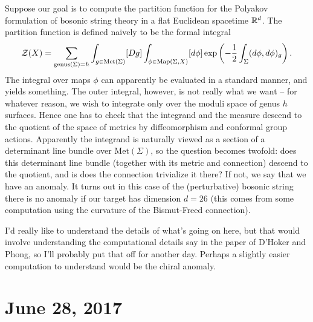 \documentclass{amsart}
\begin{document}
Suppose our goal is to compute the partition function for the Polyakov formulation
of bosonic string theory in a flat Euclidean spacetime $\mathbb{R}^d$.
The partition function is defined naively to be the formal integral
\begin{equation*}
    \mathcal{Z}(X) = \sum_{\text{genus}(\Sigma)=h} \int_{g\in\text{Met}(\Sigma)} [Dg]
        \int_{\phi\in\operatorname*{Map}(\Sigma, X)} [d\phi] \exp\left( -\frac{1}{2}\int_\Sigma (d\phi,d\phi)_g \right).
\end{equation*}
The integral over maps $\phi$ can apparently be evaluated in a standard manner,
and yields something. The outer integral, however, is not really what we want --
for whatever reason, we wish to integrate only over the moduli space of genus $h$
surfaces. Hence one has to check that the integrand and the measure descend to
the quotient of the space of metrics by diffeomorphism and conformal group actions.
Apparently the integrand is naturally viewed as a section of a determinant line
bundle over $\text{Met}(\Sigma)$, so the question becomes twofold: does this 
determinant line bundle (together with its metric and connection) descend to the quotient,
and is does the connection trivialize it there? If not, we say that we have an anomaly.
It turns out in this case of the (perturbative) bosonic string there is no anomaly
if our target has dimension $d=26$ (this comes from some computation using the
curvature of the Bismut-Freed connection).

I'd really like to understand the details of what's going on here, but that would
involve understanding the computational details say in the paper of D'Hoker and Phong,
so I'll probably put that off for another day. Perhaps a slightly easier computation
to understand would be the chiral anomaly.


\section{June 28, 2017}
\end{document}
